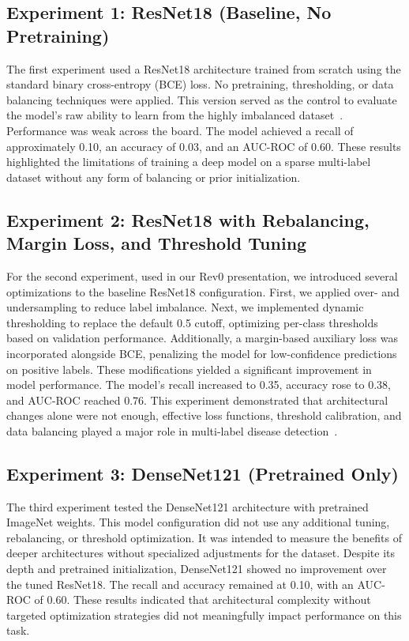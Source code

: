 \documentclass[12pt]{article}
\begin{document}
\begin{multicols}{2}
\subsection{Experiment 1: ResNet18 (Baseline, No Pretraining)}

The first experiment used a ResNet18 architecture trained from scratch using the standard binary cross-entropy (BCE) loss. No pretraining, thresholding, or data balancing techniques were applied. This version served as the control to evaluate the model's raw ability to learn from the highly imbalanced dataset~\cite{wang2017chestx}.
Performance was weak across the board. The model achieved a recall of approximately 0.10, an accuracy of 0.03, and an AUC-ROC of 0.60. These results highlighted the limitations of training a deep model on a sparse multi-label dataset without any form of balancing or prior initialization.

\subsection{Experiment 2: ResNet18 with Rebalancing, Margin Loss, and Threshold Tuning}

For the second experiment, used in our Rev0 presentation, we introduced several optimizations to the baseline ResNet18 configuration. First, we applied over- and undersampling to reduce label imbalance. Next, we implemented dynamic thresholding to replace the default 0.5 cutoff, optimizing per-class thresholds based on validation performance. Additionally, a margin-based auxiliary loss was incorporated alongside BCE, penalizing the model for low-confidence predictions on positive labels.
These modifications yielded a significant improvement in model performance. The model's recall increased to 0.35, accuracy rose to 0.38, and AUC-ROC reached 0.76. This experiment demonstrated that architectural changes alone were not enough, effective loss functions, threshold calibration, and data balancing played a major role in multi-label disease detection~\cite{12}.

\subsection{Experiment 3: DenseNet121 (Pretrained Only)}

The third experiment tested the DenseNet121 architecture with pretrained ImageNet weights. This model configuration did not use any additional tuning, rebalancing, or threshold optimization. It was intended to measure the benefits of deeper architectures without specialized adjustments for the dataset.
Despite its depth and pretrained initialization, DenseNet121 showed no improvement over the tuned ResNet18. The recall and accuracy remained at 0.10, with an AUC-ROC of 0.60. These results indicated that architectural complexity without targeted optimization strategies did not meaningfully impact performance on this task.


\end{multicols}
\end{document}
